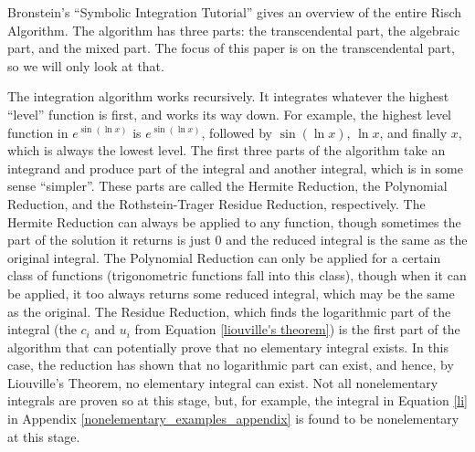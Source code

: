 Bronstein's ``Symbolic Integration Tutorial''
\cite{bronstein1998symbolic} gives an overview of the entire Risch
Algorithm.  The algorithm has three parts:  the \gls{transcendental}
part, the \gls{algebraic} part, and the mixed part.  The focus of this
paper is on the \gls{transcendental} part, so we will only look at that.

The \gls{integration} algorithm works recursively.  It integrates whatever the
highest ``level'' function is first, and works its way down.  For example,
the highest level function in $e^{\sin{(\ln{x})}}$ is
$e^{\sin{(\ln{x})}}$, followed by $\sin{(\ln{x})}$, $\ln{x}$, and
finally $x$, which is always the lowest level. The first three parts of
the algorithm take an \gls{integrand} and produce part of the integral
and another integral, which is in some sense ``simpler''. These parts
are called the Hermite Reduction, the Polynomial Reduction, and the
Rothstein-Trager Residue Reduction, respectively.  The Hermite Reduction
can always be applied to any function, though sometimes the part of the
solution it returns is just 0 and the reduced integral is the same as
the original integral.  The Polynomial Reduction can only be applied for
a certain class of functions (trigonometric functions fall into this
class), though when it can be applied, it too always returns some
reduced integral, which may be the same as the original.  The Residue
Reduction, which finds the logarithmic part of the integral (the
$c_i$ and $u_i$ from Equation \ref{liouville's theorem}) is the first
part of the algorithm that can potentially prove that no \gls{elementary}
integral exists.  In this case, the reduction has shown that no
logarithmic part can exist, and hence, by Liouville's Theorem, no
\gls{elementary} integral can exist.  Not all nonelementary
integrals are proven so at this stage, but, for example, the integral in
Equation \ref{li} in Appendix \ref{nonelementary_examples_appendix} is
found to be nonelementary at this stage.

